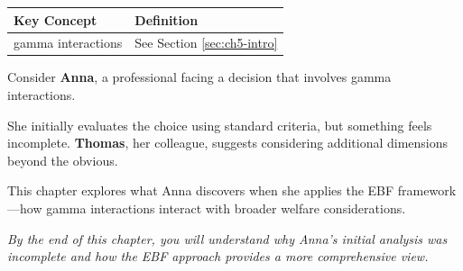 \begin{tcolorbox}[
    colback=gray!5!white,
    colframe=gray!75!black,
    title={\textbf{Begriffe in diesem Kapitel}},
    fonttitle=\bfseries
]
\small
\begin{tabular}{@{}ll@{}}
\textbf{Key Concept} & \textbf{Definition} \\
\midrule
gamma interactions & See Section \ref{sec:ch5-intro} \\
\end{tabular}
\end{tcolorbox}



\begin{tcolorbox}[
    colback=blue!5!white,
    colframe=blue!75!black,
    title={\textbf{Intuition: A Motivating Example}},
    fonttitle=\bfseries
]
Consider \textbf{Anna}, a professional facing a decision that involves gamma interactions.

She initially evaluates the choice using standard criteria, but something feels incomplete.
\textbf{Thomas}, her colleague, suggests considering additional dimensions beyond the obvious.

This chapter explores what Anna discovers when she applies the EBF framework---how
gamma interactions interact with broader welfare considerations.

\medskip
\textit{By the end of this chapter, you will understand why Anna's initial analysis
was incomplete and how the EBF approach provides a more comprehensive view.}
\end{tcolorbox}




